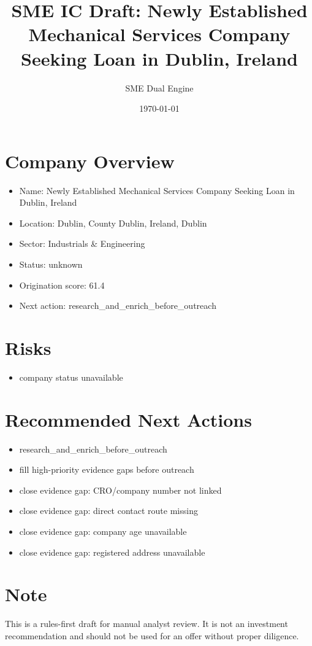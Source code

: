 \documentclass[11pt,a4paper]{article}
\title{SME IC Draft: Newly Established Mechanical Services Company Seeking Loan in Dublin, Ireland}
\author{SME Dual Engine}
\date{\today}
\begin{document}
\maketitle
\section*{Company Overview}
\begin{itemize}[leftmargin=1.4em]
\item Name: Newly Established Mechanical Services Company Seeking Loan in Dublin, Ireland
\item Location: Dublin, County Dublin, Ireland, Dublin
\item Sector: Industrials \& Engineering
\item Status: unknown
\item Origination score: 61.4
\item Next action: research\_and\_enrich\_before\_outreach
\end{itemize}
\section*{Risks}
\begin{itemize}[leftmargin=1.4em]
\item company status unavailable
\end{itemize}
\section*{Recommended Next Actions}
\begin{itemize}[leftmargin=1.4em]
\item research\_and\_enrich\_before\_outreach
\item fill high-priority evidence gaps before outreach
\item close evidence gap: CRO/company number not linked
\item close evidence gap: direct contact route missing
\item close evidence gap: company age unavailable
\item close evidence gap: registered address unavailable
\end{itemize}
\section*{Note}
This is a rules-first draft for manual analyst review. It is not an investment
recommendation and should not be used for an offer without proper diligence.
\end{document}

